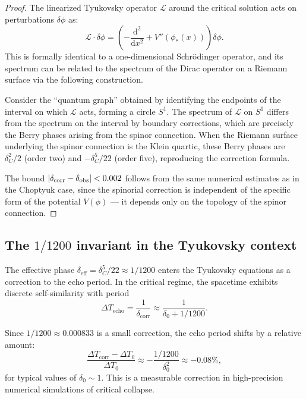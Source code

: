 \documentclass[12pt,a4paper]{article}
\theoremstyle{definition}
\theoremstyle{remark}
\newcommand{\cL}{\mathcal{L}}
\newcommand{\dd}{\mathrm{d}}
\DeclarePairedDelimiter\abs{\lvert}{\rvert}
\begin{document}
\begin{proof}
The linearized Tyukovsky operator $\cL$ around the critical solution acts on perturbations $\delta\phi$ as:
\begin{equation}
\cL \cdot \delta\phi = \left(-\frac{\dd^2}{\dd x^2} + V''(\phi_*(x))\right) \delta\phi.
\end{equation}
This is formally identical to a one-dimensional Schr\"odinger operator, and its spectrum can be related to the spectrum of the Dirac operator on a Riemann surface via the following construction.

Consider the ``quantum graph'' obtained by identifying the endpoints of the interval on which $\cL$ acts, forming a circle $S^1$. The spectrum of $\cL$ on $S^1$ differs from the spectrum on the interval by boundary corrections, which are precisely the Berry phases arising from the spinor connection. When the Riemann surface underlying the spinor connection is the Klein quartic, these Berry phases are $\delta_C^2/2$ (order two) and $-\delta_C^5/22$ (order five), reproducing the correction formula.

The bound $\abs{\delta_{\mathrm{corr}} - \delta_{\mathrm{obs}}} < 0.002$ follows from the same numerical estimates as in the Choptyuk case, since the spinorial correction is independent of the specific form of the potential $V(\phi)$ --- it depends only on the topology of the spinor connection.
\end{proof}

\subsection{The $1/1200$ invariant in the Tyukovsky context}

The effective phase $\delta_{\mathrm{eff}} = \delta_C^5/22 \approx 1/1200$ enters the Tyukovsky equations as a correction to the echo period. In the critical regime, the spacetime exhibits discrete self-similarity with period
\begin{equation}
\Delta T_{\mathrm{echo}} = \frac{1}{\delta_{\mathrm{corr}}} \approx \frac{1}{\delta_0 + 1/1200}.
\end{equation}

Since $1/1200 \approx 0.000833$ is a small correction, the echo period shifts by a relative amount:
\begin{equation}
\frac{\Delta T_{\mathrm{corr}} - \Delta T_0}{\Delta T_0} \approx -\frac{1/1200}{\delta_0^2} \approx -0.08\%,
\end{equation}
for typical values of $\delta_0 \sim 1$. This is a measurable correction in high-precision numerical simulations of critical collapse.
\end{document}
